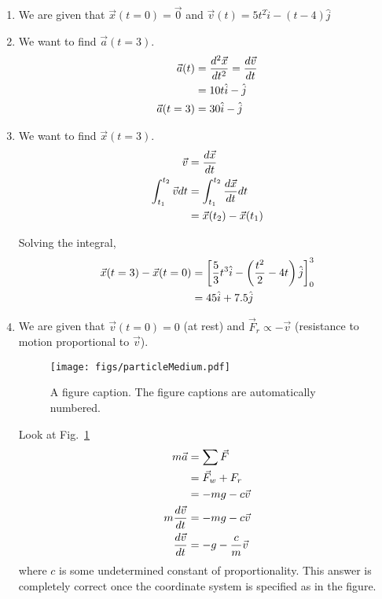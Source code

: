 \begin{enumerate}[label = \bfseries (\alph*)]
\item We are given that $\vec{x}(t=0) = \vec{0}$ and $\vec{v}(t) = 5t^2 \hat{i} - (t-4)\hat{j}$
\item We want to find $\vec{a}(t=3)$.
\begin{align}
   \vec{a}(t) & = \frac{d^2 \vec{x}}{dt^2} = \frac{d\vec{v}}{dt} \nonumber \\
   &= 10 t \hat{i}  - \hat{j}  \nonumber \\
   \vec{a} (t=3) &= 30 \hat{i} - \hat{j}
\end{align}

\item We want to find $\vec{x}(t=3)$.
\begin{align}
   \vec{v} &= \frac{d\vec{x}}{dt} \nonumber \\
   \int_{t_1}^{t_2} \vec{v} dt &=  \int_{t_1}^{t_2} \frac{d\vec{x}}{dt}  dt\nonumber \\
         &=\vec{x}(t_2) - \vec{x}(t_1)
\end{align}

Solving the integral, 
\begin{align}
   \vec{x}(t=3) - \vec{x}(t=0) &= \left[ \frac{5}{3}t^3 \hat{i} - \left(\frac{t^2}{2} - 4t\right)\hat{j}\right]^{3}_0 \nonumber \\
   &= 45 \hat{i} + 7.5 \hat{j}
\end{align}


\item We are given that $\vec{v}(t=0) = 0$ (at rest) and $\vec{F}_r \propto -\vec{v}$ (resistance to motion proportional to $\vec{v}$). 


\begin{figure}
\begin{center}
\texttt{[image: figs/particleMedium.pdf]}
\caption{\label{2015:q5:fig:particle1} A figure caption. The figure captions are
automatically numbered.}
\end{center}
\end{figure}

Look at Fig.~\ref{2015:q5:fig:particle1}
\begin{align}
   m \vec{a} &= \sum \vec{F} \nonumber\\
    &= \vec{F}_w + F_r \nonumber \\
   &= -m g - c \vec{v} \nonumber \\
   m \frac{d\vec{v}}{dt} &= -mg - c \vec{v} \nonumber \\
    \frac{d\vec{v}}{dt} &= -g - \frac{c}{m} \vec{v}
\end{align}
where $c$ is some undetermined constant of proportionality. This answer is completely correct once the coordinate system is specified as in the figure.


\end{enumerate}
